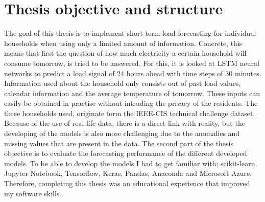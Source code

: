 \section{Thesis objective and structure}
The goal of this thesis is to implement short-term load forecasting for individual households when using only a limited amount of information. Concrete, this means that first the question of how much electricity a certain household will consume tomorrow, is tried to be answered. For this, it is looked at LSTM neural networks to predict a load signal of 24 hours ahead with time steps of 30 minutes. Information used about the household only consists out of past load values, calendar information and the average temperature of tomorrow. These inputs can easily be obtained in practise without intruding the privacy of the residents. The three households used, originate form the IEEE-CIS technical challenge dataset. Because of the use of real-life data, there is a direct link with reality, but the developing of the models is also more challenging due to the anomalies and missing values that are present in the data. The second part of the thesis objective is to evaluate the forecasting performance of the different developed models. To be able to develop the models I had to get familiar with: scikit-learn, Jupyter Notebook, Tensorflow, Keras, Pandas, Anaconda and Microsoft Azure. Therefore, completing this thesis was an educational experience that improved my software skills.\\ 


